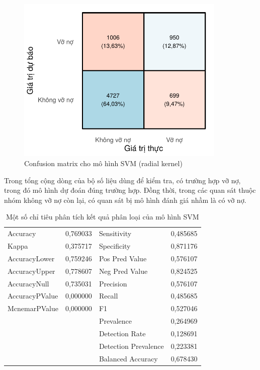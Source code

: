 \documentclass[a4paper]{report}\usepackage[]{graphicx}\usepackage[]{color}
\newenvironment{knitrout}{}{} %
\begin{document}
\begin{figure}[h]
\centering
\capstart

\begin{knitrout}\small
{}\color{fgcolor}
\includegraphics[width=10cm]{Figures/svm_confusion_mat-1} 

\end{knitrout}
  
\caption{Confusion matrix cho mô hình SVM (radial kernel)}
\label{fig:svm_confution_mat}
\end{figure}



Trong tổng cộng  dòng của bộ số liệu dùng để kiểm tra, có  trường hợp vỡ nợ, trong đó mô hình dự đoán đúng  trường hợp. Đồng thời, trong các quan sát thuộc nhóm không vỡ nợ còn lại, có  quan sát bị mô hình đánh giá nhầm là có vỡ nợ.

\begin{table}[htb!]
\centering
\begin{tabular}{lrlr}
  \hline
  \hline
Accuracy & 0,769033 & Sensitivity & 0,485685 \\ 
  Kappa & 0,375717 & Specificity & 0,871176 \\ 
  AccuracyLower & 0,759246 & Pos Pred Value & 0,576107 \\ 
  AccuracyUpper & 0,778607 & Neg Pred Value & 0,824525 \\ 
  AccuracyNull & 0,735031 & Precision & 0,576107 \\ 
  AccuracyPValue & 0,000000 & Recall & 0,485685 \\ 
  McnemarPValue & 0,000000 & F1 & 0,527046 \\ 
   &  & Prevalence & 0,264969 \\ 
   &  & Detection Rate & 0,128691 \\ 
   &  & Detection Prevalence & 0,223381 \\ 
   &  & Balanced Accuracy & 0,678430 \\ 
   \hline
\end{tabular}
\caption{Một số chỉ tiêu phân tích kết quả phân loại của mô hình SVM} 
\label{tab:svm_cm}
\end{table}
\end{document}
